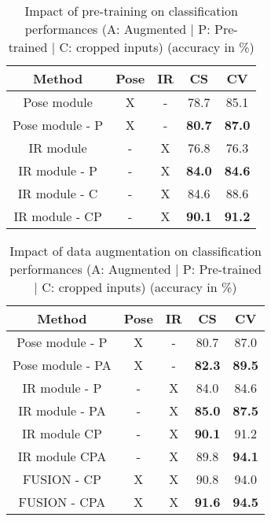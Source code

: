 \documentclass[letterpaper, 10 pt, conference]{ieeeconf}
\begin{document}
\begin{table}[t]
\caption{Impact of pre-training on classification performances (A: Augmented | P: Pre-trained | C: cropped inputs) (accuracy in \%)}
\label{pretraining_results}
\begin{center}
\begin{tabular}{ccccc}
Method & Pose & IR & CS & CV \\
\hline \hline
Pose module & X & - & 78.7 & 85.1 \\
Pose module - P & X & - & \textbf{80.7} & \textbf{87.0} \\
\hline
IR module & - & X & 76.8 & 76.3 \\
IR module - P & - & X & \textbf{84.0} & \textbf{84.6} \\
\hline
IR module - C & - & X & 84.6 & 88.6 \\
IR module - CP & - & X & \textbf{90.1} & \textbf{91.2} \\ 
\end{tabular} 
\end{center}
\end{table}

\begin{table}[t]
\caption{Impact of data augmentation on classification performances (A: Augmented | P: Pre-trained | C: cropped inputs) (accuracy in \%)}
\label{augmentation_results}
\begin{center}
\begin{tabular}{ccccc}
Method & Pose & IR & CS & CV \\
\hline \hline
Pose module - P & X & - & 80.7 & 87.0 \\
Pose module - PA & X & - & \textbf{82.3} & \textbf{89.5} \\
 \hline
IR module - P & - & X & 84.0 & 84.6 \\
IR module - PA & - & X & \textbf{85.0} & \textbf{87.5} \\
 \hline
IR module CP & - & X & \textbf{90.1} & 91.2 \\
IR module CPA & - & X & 89.8 & \textbf{94.1} \\
 \hline
FUSION - CP & X & X & 90.8 & 94.0 \\
FUSION - CPA & X & X & \textbf{91.6} & \textbf{94.5} \\ 
\end{tabular}
\end{center}
\end{table}
\end{document}

